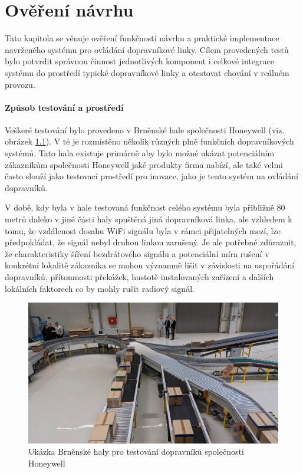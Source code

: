 \chapter{Ověření návrhu}
Tato kapitola se věnuje ověření funkčnosti návrhu a praktické implementace navrženého systému pro ovládání dopravníkové linky. Cílem provedených testů bylo potvrdit správnou činnost jednotlivých komponent i celkové integrace systému do prostředí typické dopravníkové linky a otestovat chování v reálném provozu.

\subsubsection{Způsob testování a prostředí}

Veškeré testování bylo provedeno v Brněnské hale společnosti Honeywell (viz. obrázek \ref{fig:BrnenskaHoneywellHala}). V té je rozmístěno několik různých plně funkčních dopravníkových systémů. Tato hala existuje primárně aby bylo možné ukázat potenciálním zákazníkům společnosti Honeywell jaké produkty firma nabízí, ale také velmi často slouží jako testovací prostředí pro inovace, jako je tento systém na ovládání dopravníků.

V době, kdy byla v hale testovaná funkčnost celého systému byla přibližně 80 metrů daleko v jiné části haly spuštěná jiná dopravníková linka, ale vzhledem k tomu, že vzdá\-le\-nost dosahu WiFi signálu byla v rámci přijatelných mezí, lze předpokládat, že signál nebyl druhou linkou zarušený. Je ale potřebné zdůraznit, že charakteristiky šíření bezdrátového signálu a potenciální míra rušení v konkrétní lokalitě zákazníka se mohou významně lišit v závislosti na uspořádání dopravníků, přítomnosti překážek, hustotě instalovaných zařízení a dalších lokálních faktorech co by mohly rušit radiový signál.

\begin{figure}[hptb]
	\centering
	\includegraphics[width=1\linewidth]{images/BrnenskaHoneywellHala.png}
	\caption{Ukázka Brněnské haly pro testování dopravníků společnosti Honeywell \cite{HoneywellHala}}
	\label{fig:BrnenskaHoneywellHala}
\end{figure}

